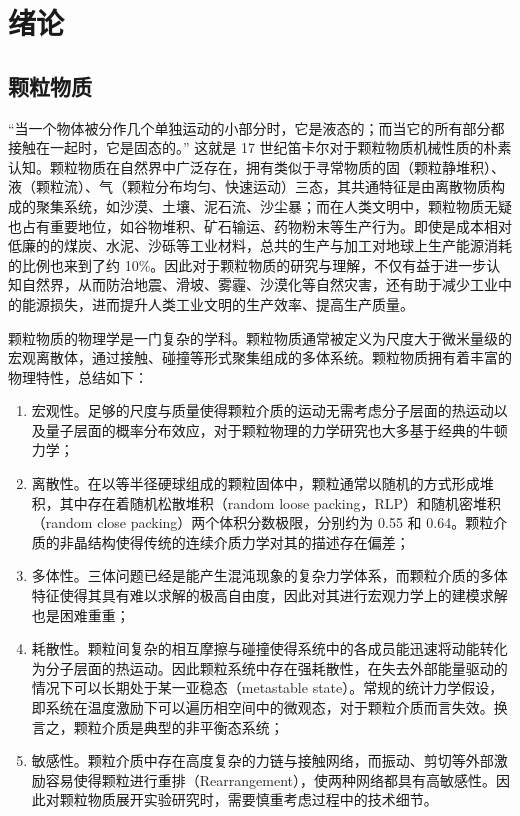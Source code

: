 
\chapter{绪论}

\section{颗粒物质}

“当一个物体被分作几个单独运动的小部分时，它是液态的；而当它的所有部分都接触在一起时，它是固态的。” 这就是 17 世纪笛卡尔对于颗粒物质机械性质的朴素认知。颗粒物质在自然界中广泛存在，拥有类似于寻常物质的固（颗粒静堆积）、液（颗粒流）、气（颗粒分布均匀、快速运动）三态\cite{RevModPhys.68.1259}，其共通特征是由离散物质构成的聚集系统，如沙漠、土壤、泥石流、沙尘暴；而在人类文明中，颗粒物质无疑也占有重要地位，如谷物堆积、矿石输运、药物粉末等生产行为。即使是成本相对低廉的的煤炭、水泥、沙砾等工业材料，总共的生产与加工对地球上生产能源消耗的比例也来到了约 \num{10}\%\cite{duran2000sands}。因此对于颗粒物质的研究与理解，不仅有益于进一步认知自然界，从而防治地震、滑坡、雾霾、沙漠化等自然灾害，还有助于减少工业中的能源损失，进而提升人类工业文明的生产效率、提高生产质量。

颗粒物质的物理学是一门复杂的学科。颗粒物质通常被定义为尺度大于微米量级的宏观离散体，通过接触、碰撞等形式聚集组成的多体系统。颗粒物质拥有着丰富的物理特性，总结如下：

\begin{enumerate}
  \item 宏观性。足够的尺度与质量使得颗粒介质的运动无需考虑分子层面的热运动以及量子层面的概率分布效应，对于颗粒物理的力学研究也大多基于经典的牛顿力学；
  \item 离散性。在以等半径硬球组成的颗粒固体中，颗粒通常以随机的方式形成堆积，其中存在着随机松散堆积（random loose packing，RLP）和随机密堆积（random close packing）两个体积分数极限，分别约为 0.55\cite{PhysRevLett.64.2727} 和 0.64\cite{RevModPhys.82.789}。颗粒介质的非晶结构使得传统的连续介质力学对其的描述存在偏差\cite{RevModPhys.71.435}；
  \item 多体性。三体问题已经是能产生混沌现象的复杂力学体系，而颗粒介质的多体特征使得其具有难以求解的极高自由度，因此对其进行宏观力学上的建模求解也是困难重重；
  \item 耗散性。颗粒间复杂的相互摩擦与碰撞使得系统中的各成员能迅速将动能转化为分子层面的热运动。因此颗粒系统中存在强耗散性，在失去外部能量驱动的情况下可以长期处于某一亚稳态（metastable state）。常规的统计力学假设，即系统在温度激励下可以遍历相空间中的微观态，对于颗粒介质而言失效。换言之，颗粒介质是典型的非平衡态系统；
  \item 敏感性。颗粒介质中存在高度复杂的力链与接触网络，而振动、剪切等外部激励容易使得颗粒进行重排（Rearrangement），使两种网络都具有高敏感性。因此对颗粒物质展开实验研究时，需要慎重考虑过程中的技术细节。
\end{enumerate}

